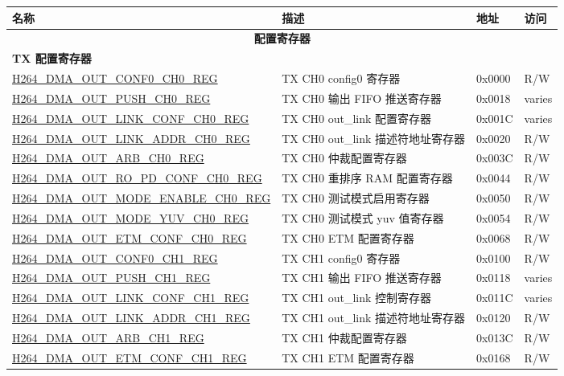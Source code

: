 \begin{longtable}{ | p{7.5cm} | p{5.7cm} | p{1.2cm} | p{1cm} | }
    \hline\rowcolor{lightgray}
    {\bfseries 名称} & {\bfseries 描述} &  {\bfseries 地址} & {\bfseries 访问} \\ \hline
    \endhead
    \multicolumn{4}{|c|}{\cellcolor{gray!15}\textbf{配置寄存器}} \\ \hline
    \multicolumn{4}{|l|}{\textbf{TX 配置寄存器}} \\ \hline
    \hyperref[regdesc:H264DMAOUTCONF0CH0REG]{H264\_DMA\_OUT\_CONF0\_CH0\_REG} & TX CH0 config0 寄存器 & 0x0000 & R/W \\ \hline
    \hyperref[regdesc:H264DMAOUTPUSHCH0REG]{H264\_DMA\_OUT\_PUSH\_CH0\_REG} &  TX CH0 输出 FIFO 推送寄存器 & 0x0018 & varies \\ \hline
    \hyperref[regdesc:H264DMAOUTLINKCONFCH0REG]{H264\_DMA\_OUT\_LINK\_CONF\_CH0\_REG} & TX CH0 out\_link 配置寄存器 & 0x001C & varies \\ \hline
    \hyperref[regdesc:H264DMAOUTLINKADDRCH0REG]{H264\_DMA\_OUT\_LINK\_ADDR\_CH0\_REG} & TX CH0 out\_link 描述符地址寄存器 & 0x0020 & R/W \\ \hline
    \hyperref[regdesc:H264DMAOUTARBCH0REG]{H264\_DMA\_OUT\_ARB\_CH0\_REG} & TX CH0 仲裁配置寄存器 & 0x003C & R/W \\ \hline
    \hyperref[regdesc:H264DMAOUTROPDCONFCH0REG]{H264\_DMA\_OUT\_RO\_PD\_CONF\_CH0\_REG} & TX CH0 重排序 RAM 配置寄存器 & 0x0044 & R/W \\ \hline
    \hyperref[regdesc:H264DMAOUTMODEENABLECH0REG]{H264\_DMA\_OUT\_MODE\_ENABLE\_CH0\_REG} & TX CH0 测试模式启用寄存器 & 0x0050 & R/W \\ \hline
    \hyperref[regdesc:H264DMAOUTMODEYUVCH0REG]{H264\_DMA\_OUT\_MODE\_YUV\_CH0\_REG} & TX CH0 测试模式 yuv 值寄存器 & 0x0054 & R/W \\ \hline
    \hyperref[regdesc:H264DMAOUTETMCONFCH0REG]{H264\_DMA\_OUT\_ETM\_CONF\_CH0\_REG} & TX CH0 ETM 配置寄存器 & 0x0068 & R/W \\ \hline

    \hyperref[regdesc:H264DMAOUTCONF0CH1REG]{H264\_DMA\_OUT\_CONF0\_CH1\_REG} & TX CH1 config0 寄存器 & 0x0100 & R/W \\ \hline
    \hyperref[regdesc:H264DMAOUTPUSHCH1REG]{H264\_DMA\_OUT\_PUSH\_CH1\_REG} & TX CH1 输出 FIFO 推送寄存器 & 0x0118 & varies \\ \hline
    \hyperref[regdesc:H264DMAOUTLINKCONFCH1REG]{H264\_DMA\_OUT\_LINK\_CONF\_CH1\_REG} & TX CH1 out\_link 控制寄存器 & 0x011C & varies \\ \hline
    \hyperref[regdesc:H264DMAOUTLINKADDRCH1REG]{H264\_DMA\_OUT\_LINK\_ADDR\_CH1\_REG} & TX CH1 out\_link 描述符地址寄存器 & 0x0120 & R/W \\ \hline
    \hyperref[regdesc:H264DMAOUTARBCH1REG]{H264\_DMA\_OUT\_ARB\_CH1\_REG} & TX CH1 仲裁配置寄存器 & 0x013C & R/W \\ \hline
    \hyperref[regdesc:H264DMAOUTETMCONFCH1REG]{H264\_DMA\_OUT\_ETM\_CONF\_CH1\_REG} & TX CH1 ETM 配置寄存器 & 0x0168 & R/W \\ \hline


\end{longtable}
